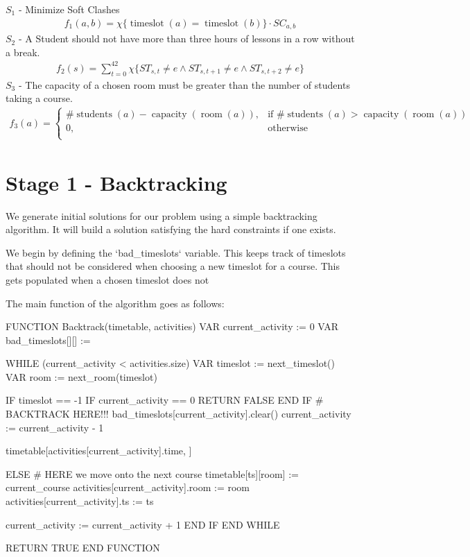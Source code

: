 \documentclass[12pt]{article}
\theoremstyle{definition}
\theoremstyle{plain}
\DeclareMathOperator{\students}{students}
\DeclareMathOperator{\ts}{timeslot}
\DeclareMathOperator{\room}{room}
\DeclareMathOperator{\capacity}{capacity}
\begin{document}
$S_1$ - Minimize Soft Clashes
\begin{align*}
f_1(a, b) = \chi \{\ts(a) = \ts(b)\} \cdot SC_{a, b}
\end{align*}
$S_2$ - A Student should not have more than three hours of lessons in a row without a break.
\begin{align*}
f_2(s) = \sum_{t = 0}^{42}\chi \{ST_{s,t} \neq e \land ST_{s,t + 1} \neq e \land ST_{s,t + 2} \neq e\}
\end{align*}
$S_3$ - The capacity of a chosen room must be greater than the number of students taking a course.
\begin{align*}
f_3(a) = 
	\begin{cases}
		\#\students(a) - \capacity(\room(a)),  & \text{if } \# \students(a) > \capacity(\room(a))\\
		0, & \text{otherwise} \\
	\end{cases}
\end{align*}

\section{Stage 1 - Backtracking}

We generate initial solutions for our problem using a simple backtracking algorithm. It will build a solution satisfying the hard constraints if one exists.

We begin by defining the `bad\_timeslots` variable. This keeps track of timeslots that should not be considered when choosing a new timeslot for a course. This gets populated when a chosen timeslot does not 

The main function of the algorithm goes as follows:

\begin{pseudo}
FUNCTION Backtrack(timetable, activities)
	VAR current_activity := 0
	VAR bad_timeslots[][] := {}
	
	WHILE (current_activity < activities.size) 
		VAR timeslot := next_timeslot()
		VAR room := next_room(timeslot)
		
		IF timeslot == -1
			IF current_activity == 0
				RETURN FALSE
			END IF
			# BACKTRACK HERE!!!
			bad_timeslots[current_activity].clear()
			current_activity := current_activity - 1
			
			timetable[activities[current_activity].time, ]
			
		ELSE 
			# HERE we move onto the next course
			timetable[ts][room] := current_course
			activities[current_activity].room := room
			activities[current_activity].ts := ts
			
			current_activity := current_activity + 1
		END IF
	END WHILE
	
	RETURN TRUE
END FUNCTION
\end{pseudo}
\end{document}

